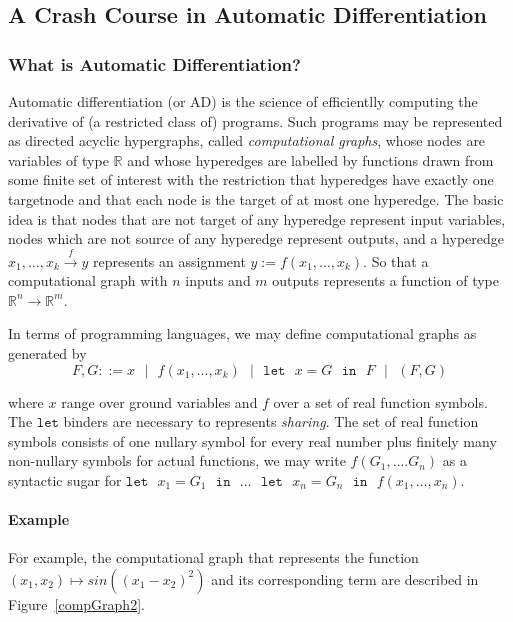 \subsection{A Crash Course in Automatic Differentiation}

\subsubsection{What is Automatic Differentiation?}
Automatic differentiation (or AD) is the science of efficientlly computing the derivative of (a restricted class of) programs. Such programs may be represented as directed acyclic hypergraphs, called \emph{computational graphs}, whose nodes are variables of type $\mathbb{R}$ and whose hyperedges are labelled by functions drawn from some finite set of interest with the restriction that hyperedges have exactly one targetnode and that each node is the target of at most one hyperedge. The basic idea is that nodes that are not target of any hyperedge represent input variables, nodes which are not source of any hyperedge represent outputs, and a hyperedge $x_1, \dots, x_k \xrightarrow{f} y$ represents an assignment $y:= f(x_1,\dots, x_k)$. So that a computational graph with $n$ inputs and $m$ outputs represents a function of type $\mathbb{R}^n\rightarrow \mathbb{R}^m$. 

In terms of programming languages, we may define computational graphs as generated by
$$ F, G ::= x \mbox{ }|\mbox{ }  f(x_1,...,x_k) \mbox{ }|\mbox{ }  \mathtt{let} \mbox{ } x = G \mbox{ } \mathtt{in} \mbox{ }F \mbox{ }|\mbox{ }  (F,G) $$

where $x$ range over ground variables and $f$ over a set of real function symbols. The $\mathtt{let}$ binders are necessary to represents \emph{sharing}. The set of real function symbols consists of one nullary symbol for every real number plus finitely many non-nullary symbols for actual functions, we may write $f(G_1,\dots.G_n)$ as a syntactic sugar for $\mathtt{let} \mbox{ } x_1 = G_1 \mbox{ } \mathtt{in} \mbox{ } \dots \mbox{ } \mathtt{let} \mbox{ } x_n = G_n \mbox{ } \mathtt{in}  \mbox{ } f(x_1,...,x_n)$. 

\paragraph{Example} For example, the computational graph that represents the function $(x_1, x_2) \mapsto sin((x_1-x_2)^2)$ and its corresponding term are described in Figure~\ref{compGraph2}.

